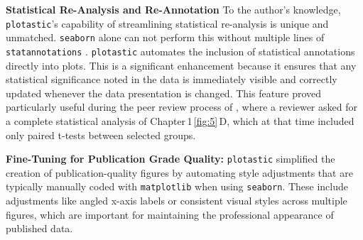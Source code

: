 \textbf{Statistical Re-Analysis and Re-Annotation}
To the author's knowledge, \texttt{plotastic}'s capability of streamlining
statistical re-analysis is unique and unmatched. \texttt{seaborn} alone can not
perform this without multiple lines of \texttt{statannotations}
\cite{charlierTrevismdStatannotationsV02022}. \texttt{plotastic} automates the
inclusion of statistical annotations directly into plots. This is a significant
enhancement because it ensures that any statistical significance noted in the
data is immediately visible and correctly updated whenever the data presentation
is changed. This feature proved particularly useful during the peer review
process of \citet{kuricModelingMyelomaDissemination2024}, where a reviewer asked
for a complete statistical analysis of Chapter\,1\,\ref{fig:5}\,D, which at that
time included only paired t-tests between selected groups.

\textbf{Fine-Tuning for Publication Grade Quality:}
\texttt{plotastic} simplified the creation of publication-quality figures by
automating style adjustments that are typically manually coded with
\texttt{matplotlib} when using \texttt{seaborn}. These include adjustments like
angled x-axis labels or consistent visual styles across multiple figures, which
are important for maintaining the professional appearance of published data.


